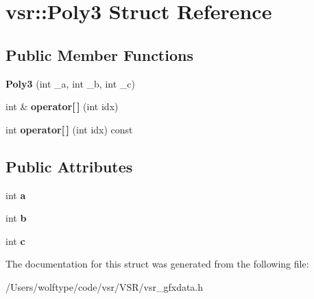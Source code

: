 \hypertarget{structvsr_1_1_poly3}{\section{vsr\-:\-:Poly3 Struct Reference}
\label{structvsr_1_1_poly3}
}
\subsection*{Public Member Functions}
\begin{DoxyCompactItemize}
\item 
\hypertarget{structvsr_1_1_poly3_ae908aead8a3df2d0e70ef39b3c084819}{{\bfseries Poly3} (int \-\_\-a, int \-\_\-b, int \-\_\-c)}\label{structvsr_1_1_poly3_ae908aead8a3df2d0e70ef39b3c084819}

\item 
\hypertarget{structvsr_1_1_poly3_aecbf2abcc03f759780a6d9d9bb0608a7}{int \& {\bfseries operator\mbox{[}$\,$\mbox{]}} (int idx)}\label{structvsr_1_1_poly3_aecbf2abcc03f759780a6d9d9bb0608a7}

\item 
\hypertarget{structvsr_1_1_poly3_a091a4a011293d6f6d0f66eb8a745cc5a}{int {\bfseries operator\mbox{[}$\,$\mbox{]}} (int idx) const }\label{structvsr_1_1_poly3_a091a4a011293d6f6d0f66eb8a745cc5a}

\end{DoxyCompactItemize}
\subsection*{Public Attributes}
\begin{DoxyCompactItemize}
\item 
\hypertarget{structvsr_1_1_poly3_a007c28d7bb22da92d4a721d96276a427}{int {\bfseries a}}\label{structvsr_1_1_poly3_a007c28d7bb22da92d4a721d96276a427}

\item 
\hypertarget{structvsr_1_1_poly3_a59fddaf9f29e344cf685d9cf390eba17}{int {\bfseries b}}\label{structvsr_1_1_poly3_a59fddaf9f29e344cf685d9cf390eba17}

\item 
\hypertarget{structvsr_1_1_poly3_a1ebea783bb20758d34446fc7d9dcdf53}{int {\bfseries c}}\label{structvsr_1_1_poly3_a1ebea783bb20758d34446fc7d9dcdf53}

\end{DoxyCompactItemize}


The documentation for this struct was generated from the following file\-:\begin{DoxyCompactItemize}
\item 
/\-Users/wolftype/code/vsr/\-V\-S\-R/vsr\-\_\-gfxdata.\-h\end{DoxyCompactItemize}
